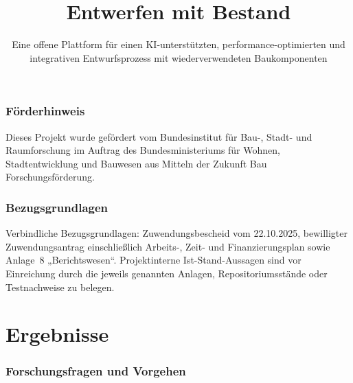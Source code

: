 \documentclass[type=zwischenbericht,theme=dark]{zukunftbau}
\title{Entwerfen mit Bestand}
\subtitle{Eine offene Plattform für einen KI-unterstützten, performance-optimierten und integrativen Entwurfsprozess mit wiederverwendeten Baukomponenten}
\begin{document}
\makecoverpages

\maketableofcontents

\section*{Förderhinweis}
\begin{Blockquote}
Dieses Projekt wurde gefördert vom Bundesinstitut für Bau-, Stadt- und Raumforschung im Auftrag des Bundesministeriums für Wohnen, Stadtentwicklung und Bauwesen aus Mitteln der Zukunft Bau Forschungsförderung.
\end{Blockquote}

\section*{Bezugsgrundlagen}
\begin{Blockquote}
Verbindliche Bezugsgrundlagen: Zuwendungsbescheid vom 22.10.2025, bewilligter Zuwendungsantrag einschließlich Arbeits-, Zeit- und Finanzierungsplan sowie Anlage~8 „Berichtswesen“. Projektinterne Ist-Stand-Aussagen sind vor Einreichung durch die jeweils genannten Anlagen, Repositoriumsstände oder Testnachweise zu belegen.
\end{Blockquote}


\makemainmatter

\part{Ergebnisse}
\label{teil:ergebnisse}

\section{Forschungsfragen und Vorgehen}
\end{document}
